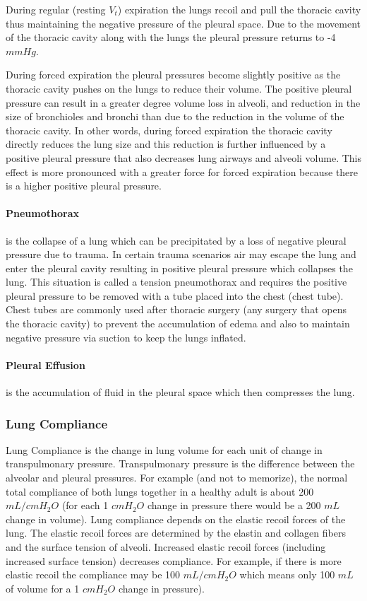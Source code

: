 During regular (resting $V_t$) expiration the lungs recoil and pull the thoracic cavity thus maintaining the negative pressure of the pleural space. Due to the movement of the thoracic cavity along with the lungs the pleural pressure returns to -4 $mmHg$.

During forced expiration the pleural pressures become slightly positive as the thoracic cavity pushes on the lungs to reduce their volume. The positive pleural pressure can result in a greater degree volume loss in alveoli, and reduction in the size of bronchioles and bronchi than due to the reduction in the volume of the thoracic cavity. In other words, during forced expiration the thoracic cavity directly reduces the lung size and this reduction is further influenced by a positive pleural pressure that also decreases lung airways and alveoli volume. This effect is more pronounced with a greater force for forced expiration because there is a higher positive pleural pressure.

\paragraph{Pneumothorax} is the collapse of a lung which can be precipitated by a loss of negative pleural pressure due to trauma. In certain trauma scenarios air may escape the lung and enter the pleural cavity resulting in positive pleural pressure which collapses the lung. This situation is called a tension pneumothorax and requires the positive pleural pressure to be removed with a tube placed into the chest (chest tube). Chest tubes are commonly used after thoracic surgery (any surgery that opens the thoracic cavity) to prevent the accumulation of edema and also to maintain negative pressure via suction to keep the lungs inflated.

\paragraph{Pleural Effusion} is the accumulation of fluid in the pleural space which then compresses the lung.

\subsubsection{Lung Compliance} 

Lung Compliance is the change in lung volume for each unit of change in transpulmonary pressure. Transpulmonary pressure is the difference between the alveolar and pleural pressures. For example (and not to memorize), the normal total compliance of both lungs together in a healthy adult is about 200 $mL/cm H_2O$ (for each 1  $cm H_2O$ change in pressure there would be a 200 $mL$ change in volume). 
Lung compliance depends on the elastic recoil forces of the lung. The elastic recoil forces are determined by the elastin and collagen fibers and the surface tension of alveoli. Increased elastic recoil forces (including increased surface tension) decreases compliance. For example, if there is more elastic recoil the compliance may be 100 $mL/cm H_2O$ which means only 100 $mL$ of volume for a 1 $cm H_2O$ change in pressure).

